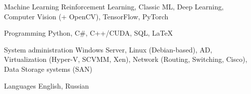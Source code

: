 

\begin{cvskills}

  \cvskill
    {Machine Learning} %
    {Reinforcement Learning, Classic ML, Deep Learning, Computer Vision (+ OpenCV), TensorFlow, PyTorch} %

  \cvskill
    {Programming} %
    {Python, C\#, C++/CUDA, SQL, LaTeX} %
    
  \cvskill
	{System administration} %
	{Windows Server, Linux (Debian-based), AD, Virtualization (Hyper-V, SCVMM, Xen), Network (Routing, Switching, Cisco), Data Storage systems (SAN)} %

  \cvskill
    {Languages} %
    {English, Russian} %

\end{cvskills}
